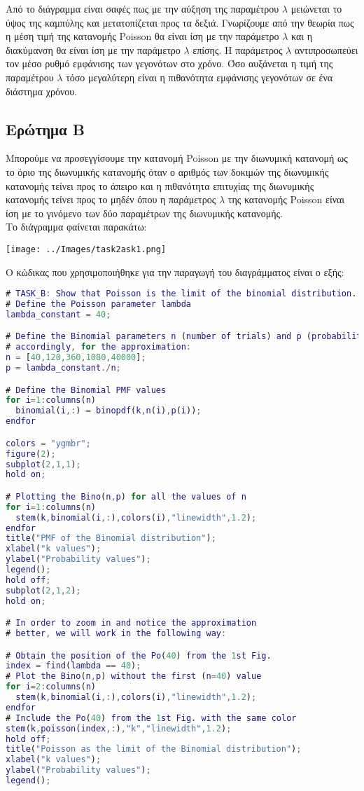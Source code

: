 \documentclass[12pt]{article}
\begin{document}
Από το διάγραμμα είναι σαφές πως με την αύξηση της παραμέτρου $\lambda$
μειώνεται το ύψος της καμπύλης και μετατοπίζεται προς τα δεξιά. Γνωρίζουμε
από την θεωρία πως η μέση τιμή της κατανομής Poisson θα είναι ίση 
με την παράμετρο $\lambda$ και η διακύμανση θα είναι ίση με την παράμετρο
$\lambda$ επίσης. Η παράμετρος $\lambda$ αντιπροσωπεύει τον μέσο ρυθμό
εμφάνισης των γεγονότων στο χρόνο. Όσο αυξάνεται η τιμή της παραμέτρου
$\lambda$ τόσο μεγαλύτερη είναι η πιθανότητα εμφάνισης γεγονότων σε ένα
διάστημα χρόνου.

\subsection{Ερώτημα Β}
Μπορούμε να προσεγγίσουμε την κατανομή Poisson με την διωνυμική 
κατανομή ως το όριο της διωνυμικής κατανομής όταν ο αριθμός των
δοκιμών της διωνυμικής κατανομής τείνει προς το άπειρο και η πιθανότητα
επιτυχίας της διωνυμικής κατανομής τείνει προς το μηδέν όπου η παράμετρος 
$\lambda$ της κατανομής Poisson είναι ίση με το γινόμενο των δύο παραμέτρων
της διωνυμικής κατανομής. \\

Το διάγραμμα φαίνεται παρακάτω: 

\begin{center}
    \texttt{[image: ../Images/task2ask1.png]}
\end{center}

\pagebreak

Ο κώδικας που χρησιμοποιήθηκε για την παραγωγή του διαγράμματος είναι ο εξής:

\begin{lstlisting}[language=Matlab]
# TASK_B: Show that Poisson is the limit of the binomial distribution.
# Define the Poisson parameter lambda
lambda_constant = 40;

# Define the Binomial parameters n (number of trials) and p (probability for success)
# accordingly, for the approximation:
n = [40,120,360,1080,40000];
p = lambda_constant./n;

# Define the Binomial PMF values
for i=1:columns(n)
  binomial(i,:) = binopdf(k,n(i),p(i));
endfor

colors = "ygmbr";
figure(2);
subplot(2,1,1);
hold on;

# Plotting the Bino(n,p) for all the values of n
for i=1:columns(n)
  stem(k,binomial(i,:),colors(i),"linewidth",1.2);
endfor
title("PMF of the Binomial distribution");
xlabel("k values");
ylabel("Probability values");
legend();
hold off;
subplot(2,1,2);
hold on;

# In order to zoom in and notice the approximation
# better, we will work in the following way:

# Obtain the position of the Po(40) from the 1st Fig.
index = find(lambda == 40);
# Plot the Bino(n,p) without the first (n=40) value  
for i=2:columns(n)
  stem(k,binomial(i,:),colors(i),"linewidth",1.2);
endfor
# Include the Po(40) from the 1st Fig. with the same color
stem(k,poisson(index,:),"k","linewidth",1.2);
hold off;
title("Poisson as the limit of the Binomial distribution");
xlabel("k values");
ylabel("Probability values");
legend();
\end{lstlisting}
\end{document}
